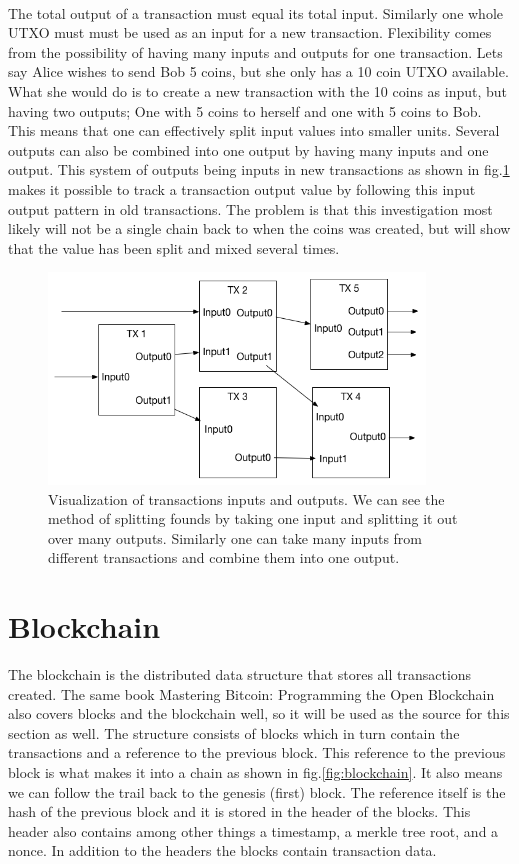 \documentclass[informationsecurity]{gucmasterproject}
\begin{document}
\paragraph{}
The total output of a transaction must equal its total input. Similarly one whole UTXO must must be used as an input for a new transaction.
Flexibility comes from the possibility of having many inputs and outputs for one transaction.
Lets say Alice wishes to send Bob 5 coins, but she only has a 10 coin UTXO available. What she would do is to create a new transaction with the 10 coins as input, but having two outputs; One with 5 coins to herself and one with 5 coins to Bob.
This means that one can effectively split input values into smaller units. Several outputs can also be combined into one output by having many inputs and one output. 
This system of outputs being inputs in new transactions as shown in fig.\ref{fig:ln_trans} makes it possible to track a transaction output value by following this input output pattern in old transactions. The problem is that this investigation most likely will not be a single chain back to when the coins was created, but will show that the value has been split and mixed several times.

\begin{figure}[h]
    \centering
    \includegraphics[width=10cm]{figs/LN_Trans.png}
    \caption{Visualization of transactions inputs and outputs. We can see the method of splitting founds by taking one input and splitting it out over many outputs. Similarly one can take many inputs from different transactions and combine them into one output.}
    \label{fig:ln_trans}
\end{figure}

\section{Blockchain}
The blockchain is the distributed data structure that stores all transactions created. The same book Mastering Bitcoin: Programming the Open Blockchain \cite{antonopoulos2017mastering} also covers blocks and the blockchain well, so it will be used as the source for this section as well. The structure consists of blocks which in turn contain the transactions and a reference to the previous block. This reference to the previous block is what makes it into a chain as shown in fig.\ref{fig:blockchain}. It also means we can follow the trail back to the genesis (first) block. The reference itself is the hash of the previous block and it is stored in the header of the blocks. This header also contains among other things a timestamp, a merkle tree root, and a nonce. In addition to the headers the blocks contain transaction data.
\end{document}
